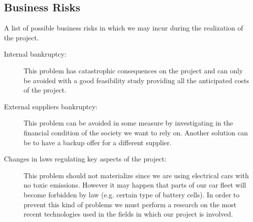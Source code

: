 \subsection{Business Risks}

A list of possible business risks in which we may incur during the realization
of the project.

\begin{description}
  \item [Internal bankruptcy: ] This problem has catastrophic consequences on
    the project and can only be avoided with a good feasibility study providing
    all the anticipated costs of the project.
  \item [External suppliers bankruptcy: ] This problem can be avoided in some
    measure by investigating in the financial condition of the society we want
    to rely on. Another solution can be to have a backup offer for a different
    supplier.
  \item [Changes in laws regulating key aspects of the project: ] This problem
    should not materialize since we are using electrical cars with no toxic
    emissions. However it may happen that parts of our car fleet will become
    forbidden by law (e.g. certain type of battery cells). In order to prevent
    this kind of problems we must perform a research on the most recent
    technologies used in the fields in which our project is involved.
\end{description}
